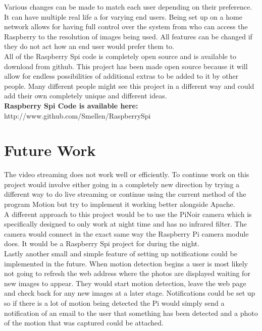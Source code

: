 \documentclass[12pt]{report}
\begin{document}
Various changes can be made to match each user depending on their preference. It can have multiple real life a for varying end users. Being set up on a home network allows for having full control over the system from who can access the Raspberry to the resolution of images being used. All features can be changed if they do not act how an end user would prefer them to.\\

All of the Raspberry Spi code is completely open source and is available to download from github. This project has been made open source because it will allow for endless possibilities of additional extras to be added to it by other people. Many different people might see this project in a different way and could add their own completely unique and different ideas.\\

\noindent
{\bf Raspberry Spi Code is available here:\\}
{http://www.github.com/Smellen/RaspberrySpi}



\section{Future Work}
\label{sec:future}

The video streaming does not work well or efficiently. To continue work on this project would involve either going in a completely new direction by trying a different way to do live streaming or continue using the current method of the program Motion but try to implement it working better alongside Apache.\\

A different approach to this project would be to use the PiNoir camera which is specifically designed to only work at night time and has no infrared filter. The camera would connect in the exact same way the Raspberry Pi camera module does. It would be a Raspberry Spi project for during the night.\\

Lastly another small and simple feature of setting up notifications could be implemented in the future. When motion detection begins a user is most likely not going to refresh the web address where the photos are displayed waiting for new images to appear. They would start motion detection, leave the web page and check back for any new images at a later stage. Notifications could be set up so if there is a lot of motion being detected the Pi would simply send a notification of an email to the user that something has been detected and a photo of the motion that was captured could be attached.\\
\end{document}
